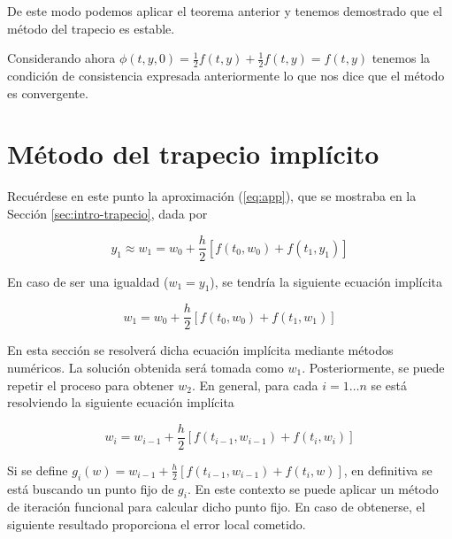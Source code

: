 \documentclass{article}
\theoremstyle{theorem-style}  %
\theoremstyle{definition-style}
\theoremstyle{example-style}
\begin{document}
	De este modo podemos aplicar el teorema anterior y tenemos demostrado que el método del trapecio es estable. 
	
	Considerando ahora $\phi(t,y,0)=\frac{1}{2}f(t,y)+\frac{1}{2}f(t,y)=f(t,y)$ tenemos la condición de consistencia expresada anteriormente lo que nos dice que el método es convergente.


\section{Método del trapecio implícito} \label{sec:trapecio-iterativo}
	
	
	Recuérdese en este punto la aproximación (\ref{eq:app}), que se mostraba en la Sección \ref{sec:intro-trapecio}, dada por

	\begin{equation*}
		y_1 \approx w_1 = w_0 + \frac{h}{2} \left[f(t_0,w_0) + f(t_1, y_1)\right]
	\end{equation*}

	En caso de ser una igualdad ($w_1 = y_1$), se tendría la siguiente ecuación implícita

	\begin{equation*}
		w_1 = w_0 + \frac{h}{2} \left[f(t_0,w_0) + f(t_1, w_1)\right]
	\end{equation*}

	En esta sección se resolverá dicha ecuación implícita mediante métodos numéricos. La solución obtenida será tomada como $w_1$. Posteriormente, se puede repetir el proceso para obtener $w_2$. En general, para cada $i = 1 \ldots n$ se está resolviendo la siguiente ecuación implícita

	\begin{equation} \label{eq:ecuacion-implicita}
		w_i = w_{i-1} + \frac{h}{2} \left[f(t_{i-1},w_{i-1}) + f(t_i, w_i)\right]
	\end{equation}

	Si se define $g_i(w) = w_{i-1} + \frac{h}{2} \left[f(t_{i-1},w_{i-1}) + f(t_i, w)\right]$, en definitiva se está buscando un punto fijo de $g_i$. En este contexto se puede aplicar un método de iteración funcional para calcular dicho punto fijo. En caso de obtenerse, el siguiente resultado proporciona el error local cometido.
	
\end{document}
